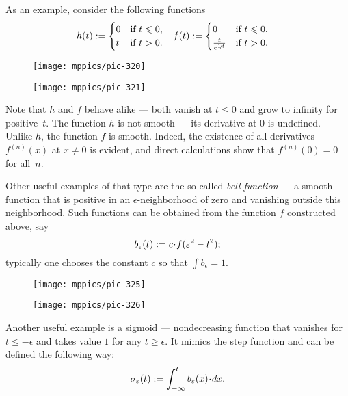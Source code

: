 As an example, consider the following functions
\begin{align*}
h(t)&\mathrel{:=}
\begin{cases}
0&\text{if}\ t\leqslant 0,
\\
t&\text{if}\ t> 0.
\end{cases}
&
f(t)&\mathrel{:=}
\begin{cases}
0&\text{if}\ t\leqslant 0,
\\
\frac{t}{e^{1\!/\!t}}&\text{if}\ t> 0.
\end{cases}
\end{align*}
\begin{figure}[ht!]
\begin{minipage}{.48\textwidth}
\centering
\texttt{[image: mppics/pic-320]}
\end{minipage}\hfill
\begin{minipage}{.48\textwidth}
\centering
\texttt{[image: mppics/pic-321]}
\end{minipage}
\end{figure}
Note that $h$ and $f$ behave alike ---
both vanish at $t\le 0$ and grow to infinity for positive~$t$.
The function $h$ is not smooth --- its derivative at $0$ is undefined.
Unlike $h$, the function $f$ is smooth.
Indeed, the existence of all derivatives $f^{(n)}(x)$ at $x\ne 0$ is evident, and direct calculations show that $f^{(n)}(0)=0$ for all~$n$.

Other useful examples of that type are the so-called \emph{bell function} --- a smooth function that is positive in an $\epsilon$-neighborhood of zero and vanishing outside this neighborhood.
Such functions can be obtained from the function $f$ constructed above, say 
\[b_\epsilon(t)\df c\cdot f(\epsilon^2-t^2);\]
typically one chooses the constant $c$ so that $\int b_\epsilon=1$.

\begin{figure}[ht!]
\begin{minipage}{.48\textwidth}
\centering
\texttt{[image: mppics/pic-325]}
\end{minipage}\hfill
\begin{minipage}{.48\textwidth}
\centering
\texttt{[image: mppics/pic-326]}
\end{minipage}
\end{figure}

Another useful example is a sigmoid --- nondecreasing function that vanishes for $t\le -\epsilon$ and takes value $1$ for any $t\ge \epsilon$.
It mimics the step function and can be defined the following way: \label{page:sigma-function}
\[\sigma_\epsilon(t)
\df 
\int_{-\infty}^t b_\epsilon(x)\cdot dx.\]

